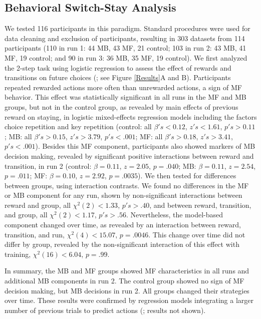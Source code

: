 \documentclass[11pt]{article} %
\begin{document}
\subsection{Behavioral Switch-Stay Analysis}
We tested 116 participants in this paradigm. Standard procedures were used for data cleaning and exclusion of participants, resulting in 303 datasets from 114 participants (110 in run 1: 44 MB, 43 MF, 21 control; 103 in run 2: 43 MB, 41 MF, 19 control; and 90 in run 3: 36 MB, 35 MF, 19 control). We first analyzed the 2-step task using logistic regression to assess the effect of rewards and transitions on future choices (\cite{akam_simple_2015}; see Figure \ref{Results}A and B). Participants repeated rewarded actions more often than unrewarded actions, a sign of MF behavior. This effect was statistically significant in all runs in the MF and MB groups, but not in the control group, as revealed by main effects of previous reward on staying, in logistic mixed-effects regression models including the factors choice repetition and key repetition (control: all $\beta's < 0.12$, $z's < 1.61$, $p's > 0.11$; MB: all $\beta's > 0.15$, $z's > 3.79$, $p's < .001$; MF: all $\beta's > 0.18$, $z's > 3.41$, $p's < .001$). Besides this MF component, participants also showed markers of MB decision making, revealed by significant positive interactions between reward and transition, in run 2 (control: $\beta = 0.11$, $z = 2.05$, $p = .040$; MB: $\beta = 0.11$, $z = 2.54$, $p = .011$; MF: $\beta = 0.10$, $z = 2.92$, $p = .0035$). We then tested for differences between groups, using interaction contrasts. We found no differences in the MF or MB component for any run, shown by non-significant interactions between reward and group, all $\chi^{2}(2) < 1.33$, $p's > .40$, and between reward, transition, and group, all $\chi^{2}(2) < 1.17$, $p's > .56$. Nevertheless, the model-based component changed over time, as revealed by an interaction between reward, transition, and run, $\chi^{2}(4) < 15.07$, $p = .0046$. This change over time did not differ by group, revealed by the non-significant interaction of this effect with training, $\chi^{2}(16) < 6.04$, $p = .99$. %

In summary, the MB and MF groups showed MF characteristics in all runs and additional MB components in run 2. The control group showed no sign of MF decision making, but MB decisions in run 2. All groups changed their strategies over time. These results were confirmed by regression models integrating a larger number of previous trials to predict actions (\cite{akam_simple_2015}; results not shown).
\end{document}
